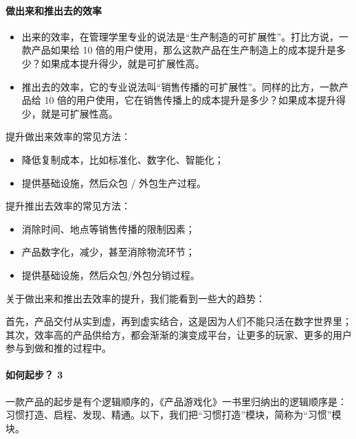 \documentclass[letterpaper,11pt,english]{sphinxmanual}
\begin{document}
\paragraph{做出来和推出去的效率}
\label{\detokenize{chapter_introduction/Product:id24}}\begin{itemize}
\item {} 
出来的效率，在管理学里专业的说法是“生产制造的可扩展性”。打比方说，一款产品如果给
10
倍的用户使用，那么这款产品在生产制造上的成本提升是多少？如果成本提升得少，就是可扩展性高。

\item {} 
推出去的效率，它的专业说法叫“销售传播的可扩展性”。同样的比方，一款产品给
10
倍的用户使用，它在销售传播上的成本提升是多少？如果成本提升得少，就是可扩展性高。

\end{itemize}

提升做出来效率的常见方法：
\begin{itemize}
\item {} 
降低复制成本，比如标准化、数字化、智能化；

\item {} 
提供基础设施，然后众包 / 外包生产过程。

\end{itemize}

提升推出去效率的常见方法：
\begin{itemize}
\item {} 
消除时间、地点等销售传播的限制因素；

\item {} 
产品数字化，减少，甚至消除物流环节；

\item {} 
提供基础设施，然后众包/外包分销过程。

\end{itemize}

关于做出来和推出去效率的提升，我们能看到一些大的趋势：

首先，产品交付从实到虚，再到虚实结合，这是因为人们不能只活在数字世界里；
其次，效率高的产品供给方，都会渐渐的演变成平台，让更多的玩家、更多的用户参与到做和推的过程中。


\paragraph{如何起步？ 3\sphinxfootnotemark[24]}
\label{\detokenize{chapter_introduction/Product:id25}}%
\begin{footnotetext}[24]\sphinxAtStartFootnote
{}
%
\end{footnotetext}\ignorespaces 
一款产品的起步是有个逻辑顺序的，《产品游戏化》一书里归纳出的逻辑顺序是：习惯打造、启程、发现、精通。以下，我们把“习惯打造”模块，简称为“习惯”模块。
\end{document}
